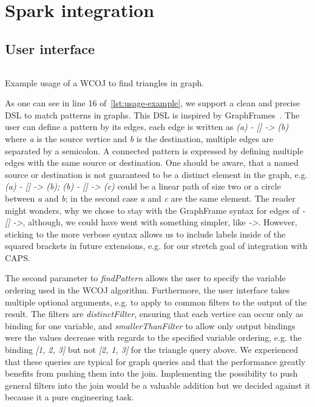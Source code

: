 \section{Spark integration}\label{sec:spark-integration}

\subsection{User interface} \label{ssec:user-interface}
\begin{listing}[H]
    \centering
    \inputminted{scala}{code/usage-example.scala}
    \caption{Example usage of a WCOJ to find triangles in graph.}
    \label{lst:usage-example}
\end{listing}

As one can see in line 16 %
of~\cref{lst:usage-example}, we support a clean and precise DSL to match patterns in graphs.
This DSL is inspired by GraphFrames~\cite{graphframe}.
The user can define a pattern by its edges, each edge is written as \textit{(a) - [] -> (b)} where \textit{a} is the
source vertice and \textit{b} is the destination, multiple edges are separated by a semicolon.
A connected pattern is expressed by defining multiple edges with the same source or destination.
One should be aware, that a named source or destination is not guaranteed to be a distinct element in the graph,
e.g. \textit{(a) - [] -> (b); (b) - [] -> (c)} could be a linear path of size two or a circle between \textit{a} and
\textit{b}; in the second case \textit{a} and \textit{c} are the same element.
The reader might wonders, why we chose to stay with the GraphFrame syntax for edges of
\textit{- [] ->}, although, we could have went with something simpler, like \textit{->}.
However, sticking to the more verbose syntax allows us to include labels inside of the squared brackets
in future extensions, e.g. for our stretch goal of integration with CAPS.

The second parameter to \textit{findPattern} allows the user to specify the variable ordering used in the WCOJ algorithm.
Furthermore, the user interface takes multiple optional arguments, e.g. to apply to common filters to the output of the result.
The filters are \textit{distinctFilter}, ensuring that each vertice can occur only as binding for one variable, and
\textit{smallerThanFilter} to allow only output bindings were the values decrease with regards to the specified variable ordering,
e.g. the binding \textit{[1, 2, 3]} but not \textit{[2, 1, 3]} for the triangle query above.
We experienced that these queries are typical for graph queries and that the performance greatly benefits from pushing
them into the join.
Implementing the possibility to push general filters into the join would be a valuable addition but we decided against it because
it a pure engineering task.

